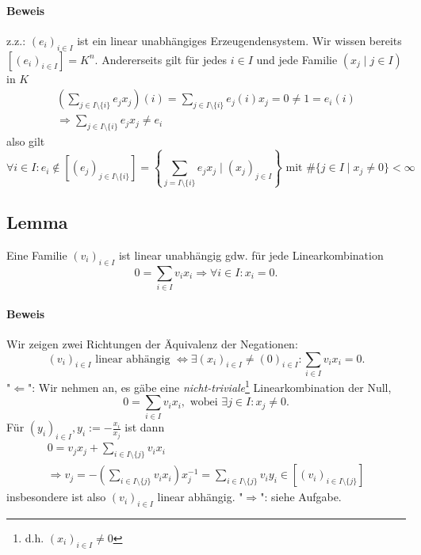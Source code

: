 \paragraph{Beweis}
	z.z.: $ (e_i)_{i\in I} $ ist ein linear unabhängiges Erzeugendensystem. Wir wissen bereits $ [(e_i)_{i\in I}] = K^n $. Andererseits gilt für jedes $i\in I$ und jede Familie $(x_j\mid j\in I)$ in $ K $
	\begin{gather*}
		\left(\sum_{j\in I\setminus\{i\}}e_jx_j\right)(i) = \sum_{j\in I\setminus\{i\}}e_j(i)x_j = 0 \neq 1 = e_i(i)\\
		\Rightarrow \sum_{j\in I\setminus\{i\}} e_jx_j \neq e_i
	\end{gather*}
	also gilt
	\begin{equation*}
		\forall i\in I: e_i \notin [(e_j)_{j\in I\setminus\{i\}}] = \left\{\sum_{j=I\setminus\{i\}} e_jx_j\mid (x_j)_{ j\in I}\right\} \text{ mit } \#\{j\in I\mid x_j \neq 0\}<\infty
	\end{equation*}
	
\subsection{Lemma}
	\begin{Lemma}
		Eine Familie $(v_i)_{i\in I}$ ist linear unabhängig gdw. für jede Linearkombination
		\[0 = \sum_{i\in I} v_ix_i \Rightarrow \forall i\in I: x_i = 0.\]
	\end{Lemma}

\paragraph{Beweis}
	Wir zeigen zwei Richtungen der Äquivalenz der Negationen: 
		\[(v_i)_{i\in I} \text{ linear abhängig } \Leftrightarrow \exists(x_i)_{i\in I} \neq (0)_{i\in I}: \sum_{i\in I} v_ix_i = 0.\]
	"$\Leftarrow$":
	Wir nehmen an, es gäbe eine \emph{nicht-triviale}\footnote{d.h. $(x_i)_{i\in I}\neq 0$} Linearkombination der Null,
		\[0 = \sum_{i\in I} v_ix_i, \text{ wobei } \exists j\in I: x_j \neq 0.\]
	Für $(y_i)_{i\in I}, y_i := - \frac{x_i}{x_j}$ ist dann
	\begin{gather*}
		0 = v_jx_j + \sum_{i\in I\setminus\{j\}} v_ix_i \\
		\Rightarrow v_j = -\left(\sum_{i\in I\setminus\{j\}}v_ix_i\right)x_j^{-1} = \sum_{i\in I\setminus\{j\}} v_iy_i \in [(v_i)_{i\in I\setminus\{j\}}]
	\end{gather*}
	insbesondere ist also $(v_i)_{i\in I}$ linear abhängig.
	"$\Rightarrow$": siehe Aufgabe.
	

